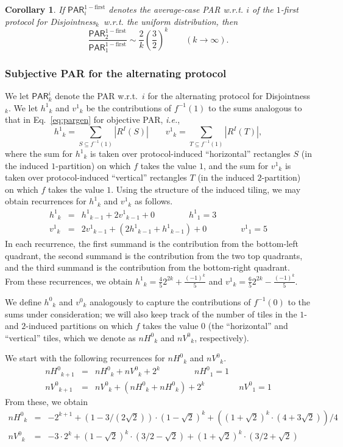 \documentclass{article}
\theoremstyle{theorem}
\newtheorem{cor}[theorem]{Corollary}
\theoremstyle{definition}
\theoremstyle{remark}
\newcommand{\ie}{\emph{i.e.}}
\newcommand{\PAR}{\ensuremath{\mathsf{PAR}}}
\newcommand{\disjoint}{{\sc Dis\-joint\-ness}\ensuremath{_k}}
\newcommand{\vy}{\ensuremath{v^1}}
\newcommand{\vn}{\ensuremath{v^0}}
\newcommand{\nv}{\ensuremath{nV^0}}
\newcommand{\hy}{\ensuremath{h^1}}
\newcommand{\hn}{\ensuremath{h^0}}
\newcommand{\nh}{\ensuremath{nH^0}}
\newcommand{\paratio}{\ensuremath{\mathsf{PAR}}}
\begin{document}
\begin{cor}
If $\PAR^\mathrm{1-first}_i$ denotes the average-case PAR w.r.t. $i$ of the $1$-first protocol for \disjoint\ w.r.t. the uniform distribution, then
\[
\frac{\PAR^\mathrm{1-first}_2}{\PAR^\mathrm{1-first}_1} \sim \frac{2}{k}\left(\frac{3}{2}\right)^k\qquad (k\rightarrow\infty).
\]
\end{cor}

\subsubsection{Subjective PAR for the alternating protocol}

We let $\paratio^i_k$ denote the PAR w.r.t.\ $i$ for the alternating protocol for \disjoint.  We let $\hy_k$ and $\vy_k$ be the contributions of $f^{-1}(1)$ to the sums analogous to that in Eq.~\ref{eq:pargen} for objective PAR, \ie,
\[
\hy_k = \sum_{S\subseteq f^{-1}(1)} |R^I(S)| \qquad \vy_k = \sum_{T\subseteq f^{-1}(1)} |R^I(T)|,
\]
where the sum for $\hy_k$ is taken over protocol-induced ``horizontal'' rectangles $S$ (in the induced $1$-partition) on which $f$ takes the value $1$, and the sum for $\vy_k$ is taken over protocol-induced ``vertical'' rectangles $T$ (in the induced $2$-partition) on which $f$ takes the value $1$.  Using the structure of the induced tiling,
we may obtain recurrences for $\hy_k$ and $\vy_k$ as follows.
\begin{eqnarray}
\hy_k &=& \hy_{k-1} + 2\vy_{k-1} + 0\qquad\qquad \hy_1 = 3\label{eq:hyk}\\
\vy_k &=& 2\vy_{k-1} + \left(2\hy_{k-1}+\hy_{k-1}\right) + 0\qquad\qquad \vy_1 = 5\label{eq:vyk}
\end{eqnarray}
In each recurrence, the first summand is the contribution from the bottom-left quadrant, the second summand is the contribution from the two top quadrants, and the third summand is the contribution from the bottom-right quadrant.  From these recurrences, we obtain $\hy_k = \frac{4}{5}2^{2k} + \frac{(-1)^k}{5}$ and $\vy_k = \frac{6}{5}2^{2k} - \frac{(-1)^k}{5}$.


We define $\hn_k$ and $\vn_k$ analogously to capture the contributions of $f^{-1}(0)$ to the sums under consideration; we will also keep track of the number of tiles in the $1$- and $2$-induced partitions on which $f$ takes the value $0$ (the ``horizontal'' and ``vertical'' tiles, which we denote as $\nh_k$ and $\nv_k$, respectively).

We start with the following recurrences for $\nh_k$ and $\nv_k$.
\begin{eqnarray*}
\nh_{k+1} &=& \nh_{k} + \nv_{k} + 2^{k} \qquad\qquad \nh_1 = 1\\
\nv_{k+1} &=& \nv_{k} + \left(\nh_{k} + \nh_{k}\right) + 2^{k} \qquad\qquad \nv_1 = 1
\end{eqnarray*}
From these, we obtain
\begin{eqnarray*}
\nh_k &=& -2^{k+1} + (1 - 3/(2\sqrt{2}))\cdot (1 -\sqrt{2})^k + ((1 + \sqrt{2})^k\cdot (4 + 3\sqrt{2}))/4\\
\nv_k &=& -3\cdot 2^k + (1 - \sqrt{2})^k\cdot (3/2 - \sqrt{2}) + (1 + \sqrt{2})^k \cdot (3/2 + \sqrt{2})
\end{eqnarray*}
\end{document}
